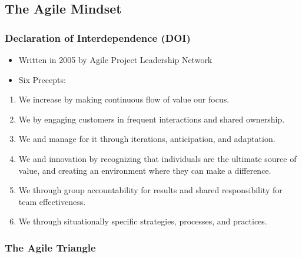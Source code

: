 \documentclass[letterpaper,10pt,english]{jupyterBook}
\begin{document}
\subsection{The Agile Mindset}
\label{\detokenize{APM/agile:the-agile-mindset}}

\subsubsection{Declaration of Interdependence (DOI)}
\label{\detokenize{APM/agile:declaration-of-interdependence-doi}}\begin{itemize}
\item {} 
\sphinxAtStartPar
Written in 2005 by Agile Project Leadership Network

\item {} 
\sphinxAtStartPar
Six Precepts:

\end{itemize}
\begin{enumerate}
%
\item {} 
\sphinxAtStartPar
We increase  by making continuous flow of value our focus.

\item {} 
\sphinxAtStartPar
We  by engaging customers in frequent interactions and shared ownership.

\item {} 
\sphinxAtStartPar
We  and manage for it through iterations, anticipation, and adaptation.

\item {} 
\sphinxAtStartPar
We  and innovation by recognizing that individuals are the ultimate source of value, and creating an environment where they can make a difference.

\item {} 
\sphinxAtStartPar
We  through group accountability for results and shared responsibility for team effectiveness.

\item {} 
\sphinxAtStartPar
We  through situationally specific strategies, processes, and practices.

\end{enumerate}


\subsubsection{The Agile Triangle}
\label{\detokenize{APM/agile:the-agile-triangle}}
\end{document}
